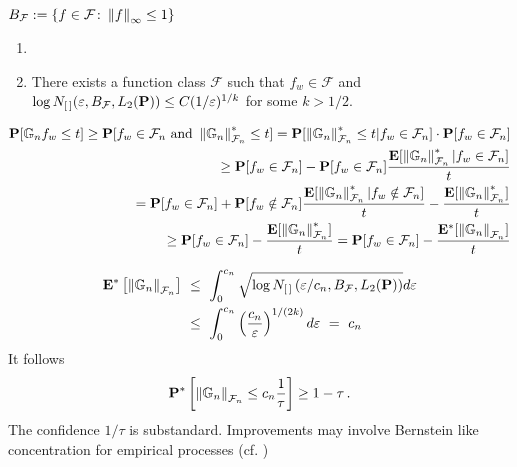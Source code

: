       $
        B_\mathcal{F}
        :=
        \left\{ 
          f\in \mathcal{F}
          \colon
          \norm{f}_\infty
          \le 
          1
        \right\}
      $
\begin{assumptions*}
  \begin{enumerate}[label={(\roman*)}]
    \item

    \item
      There exists a function class $\mathcal{F}$ such that $f_w\in \mathcal{F}$ and
      $
        \log N_{[\,]}(\varepsilon, B_\mathcal{F}, L_2(\P))
        \le
        C
        (1/\varepsilon)^{1/k} 
      $
      for some $k>1/2$.
  \end{enumerate}
\end{assumptions*}


\begin{align}
  \P[
  \mathbb{G}_n f_w \le t
  ]
  \ge
  \P[
  f_w \in \mathcal{F}_n
  \ \text{and}\ 
  \norm{\G_n}_{\mathcal{F}_n}^*
  \le t
  ]
  =
  \P[
  \norm{\G_n}_{\mathcal{F}_n}^*
  \le t
  |
  f_w \in \mathcal{F}_n
  ]
  \cdot
  \P[
  f_w \in \mathcal{F}_n
  ]
  \\
  \ge
  \P[
  f_w \in \mathcal{F}_n
  ]
  -
  \P[
  f_w \in \mathcal{F}_n
  ]
  \frac{
    \E[
  \norm{\G_n}_{\mathcal{F}_n}^*
  |
  f_w \in \mathcal{F}_n
  ]
  }{t}
  \\
  =
  \P[
  f_w \in \mathcal{F}_n
  ]
  +
  \P[
  f_w \notin \mathcal{F}_n
  ]
  \frac{
    \E[
  \norm{\G_n}_{\mathcal{F}_n}^*
  |
  f_w \notin \mathcal{F}_n
  ]
  }{t}
  -
  \frac{
    \E[
  \norm{\G_n}_{\mathcal{F}_n}^*
    ]
  }{t}
  \\
  \ge
  \P[
  f_w \in \mathcal{F}_n
  ]
  -
  \frac{
    \E[
  \norm{\G_n}_{\mathcal{F}_n}^*
    ]
  }{t}
  =
  \P[
  f_w \in \mathcal{F}_n
  ]
  -
  \frac{
    \E^*[
  \norm{\G_n}_{\mathcal{F}_n}
    ]
  }{t}
\end{align}


\begin{align}
  \E^*\left[ 
    \norm{\G_n}_{\mathcal{F}_n}
  \right]
  &
  \ 
  \le
  \ 
  \int_0^{c_n}
  \sqrt{
    \log 
    N_{[\,]}
    \left( 
    \varepsilon / c_n
    ,
    B_{\mathcal{F}}
    ,
    L_2(\P)
    \right)
  }
  d\varepsilon
  \\
  &
  \ 
  \le
  \ 
  \int_0^{c_n}
  \left( 
    \frac{c_n }{\varepsilon}
  \right)^{1/(2k)}
  d \varepsilon
  \ 
  =
  \ 
  c_n
\end{align}
It follows
\begin{gather}
  \P^*\left[ 
    \norm{\G_n}_{\mathcal{F}_n}
    \le c_n \frac{1}{\tau}
  \right]
  \ge
  1-\tau
   \,.
\end{gather}
The confidence $1/\tau$ is substandard. Improvements may involve Bernstein like concentration for empirical processes (cf. \cite[Section~2.14.2]{vaart2013})

